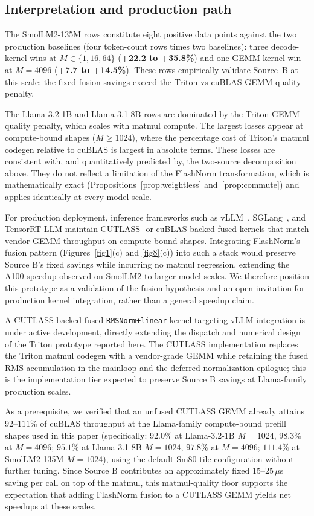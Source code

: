 \documentclass{article}
\begin{document}
\subsection{Interpretation and production path}

The SmolLM2-135M rows constitute eight positive data points against the two production baselines (four token-count rows times two baselines): three decode-kernel wins at $M \in \{1, 16, 64\}$ (\textbf{+22.2 to +35.8\%}) and one GEMM-kernel win at $M{=}4096$ (\textbf{+7.7 to +14.5\%}). These rows empirically validate Source~B at this scale: the fixed fusion savings exceed the Triton-vs-cuBLAS GEMM-quality penalty.

The Llama-3.2-1B and Llama-3.1-8B rows are dominated by the Triton GEMM-quality penalty, which scales with matmul compute. The largest losses appear at compute-bound shapes ($M \geq 1024$), where the percentage cost of Triton's matmul codegen relative to cuBLAS is largest in absolute terms. These losses are consistent with, and quantitatively predicted by, the two-source decomposition above. They do not reflect a limitation of the FlashNorm transformation, which is mathematically exact (Propositions~\ref{prop:weightless} and~\ref{prop:commute}) and applies identically at every model scale.

For production deployment, inference frameworks such as vLLM~\citep{vLLM}, SGLang~\citep{sglang}, and TensorRT-LLM maintain CUTLASS- or cuBLAS-backed fused kernels that match vendor GEMM throughput on compute-bound shapes. Integrating FlashNorm's fusion pattern (Figures~\ref{fig1}(c) and \ref{fig8}(c)) into such a stack would preserve Source B's fixed savings while incurring no matmul regression, extending the A100 speedup observed on SmolLM2 to larger model scales. We therefore position this prototype as a validation of the fusion hypothesis and an open invitation for production kernel integration, rather than a general speedup claim.

A CUTLASS-backed fused \texttt{RMSNorm+linear} kernel targeting vLLM integration is under active development, directly extending the dispatch and numerical design of the Triton prototype reported here. The CUTLASS implementation replaces the Triton matmul codegen with a vendor-grade GEMM while retaining the fused RMS accumulation in the mainloop and the deferred-normalization epilogue; this is the implementation tier expected to preserve Source B savings at Llama-family production scales.

As a prerequisite, we verified that an unfused CUTLASS GEMM already attains $92$--$111$\% of cuBLAS throughput at the Llama-family compute-bound prefill shapes used in this paper (specifically: $92.0$\% at Llama-3.2-1B $M{=}1024$, $98.3$\% at $M{=}4096$; $95.1$\% at Llama-3.1-8B $M{=}1024$, $97.8$\% at $M{=}4096$; $111.4$\% at SmolLM2-135M $M{=}1024$), using the default Sm80 tile configuration without further tuning. Since Source B contributes an approximately fixed $15$--$25\,\mu$s saving per call on top of the matmul, this matmul-quality floor supports the expectation that adding FlashNorm fusion to a CUTLASS GEMM yields net speedups at these scales.
\end{document}
